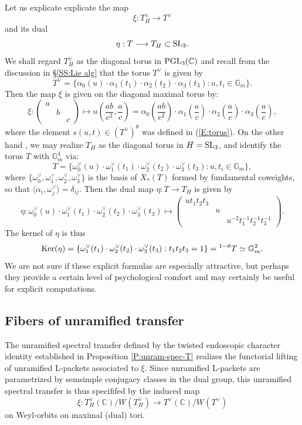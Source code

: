 \documentclass[11pt]{amsart}
\theoremstyle{plain}
\numberwithin{equation}{section}
\newcommand{\C}{\mathbb C}
\def\SL{{\rm SL}}
\def\PGL{{\rm PGL}}
\def\C{{\bf C}}
\def\C{{\mathbb C}}
\begin{document}
Let us explicate  explicate the map 
\[  \xi: T_H^{\vee}  \longrightarrow T^{\vee} \]
and its dual
\[ \eta:  T \longrightarrow T_H \subset \SL_3. \]
We shall regard $T_H^{\vee}$ as the diagonal torus in $\PGL_3(\C)$ and recall from
 the discussion in \S \ref{SS:Lie alg} that  the torus $T^{\vee}$ is given by
\[ T^{\vee} = \{ \alpha_0(u) \cdot \alpha_1(t_1) \cdot  \alpha_2(t_2) \cdot \alpha_3 (t_3): u, t_i \in \mathbb{G}_m \}.\]
  Then the map $\xi$ is given on the diagonal maximal torus by:
\[  \xi:   \left( \begin{array}{ccc}
a & & \\
& b &  \\
& & c \end{array} \right) \mapsto  u\left(\frac{ab}{c^2}, \frac{a}{c}\right) = \alpha_0\left(\frac{ab}{c^2}\right) \cdot    \alpha_1\left(\frac{a}{c}\right) \cdot  \alpha_2\left(\frac{a}{c}\right) \cdot \alpha_3 \left( \frac{a}{c}\right), \]
where the element $s(u,t) \in (T^{\vee})^{\theta}$ was defined in (\ref{E:torus}). On the other hand , we may realize $T_H$ as the diagonal torus in $H= \SL_3$, and identify the torus $T$ with $\mathbb{G}_m^4$ via:
\[  T = \{ \omega_0^{\vee}(u) \cdot\omega_1^{\vee}(t_1)  \cdot\omega_2^{\vee}(t_2)  \cdot\omega_3^{\vee}(t_3): u, t_i \in \mathbb{G}_m \}, \]  
where $\{\omega_0^{\vee} ,\omega_1^{\vee}, \omega_2^{\vee}, \omega_3^{\vee} \}$  is the basis of $X_*(T)$ formed by fundamental coweights, so that $\langle \alpha_i, \omega_j^{\vee} \rangle = \delta_{ij}$. 
Then  the dual map $\eta: T \longrightarrow T_H$ is  given by
\[  \eta: \omega_0^{\vee}(u) \cdot\omega_1^{\vee}(t_1)  \cdot\omega_2^{\vee}(t_2)  \cdot\omega_3^{\vee}(t_3)
\mapsto  \left( \begin{array}{ccc}
u t_1t_2t_3 & & \\
& u &  \\
& & u^{-2}t_1^{-1} t_2^{-1} t_3^{-1}  \end{array} \right). \] 
The kernel of $\eta$ is thus
\[  {\rm Ker}(\eta) = \{  \omega_1^{\vee}(t_1)  \cdot\omega_2^{\vee}(t_2)  \cdot\omega_3^{\vee}(t_3): t_1t_2t_3 =1 \}  = {}^{1-\theta}T \simeq  \mathbb{G}_m^2. \]
We are not sure if these explicit formulas are especially attractive, but perhaps they provide a certain level of psychological comfort and may certainly be useful for explicit computations.

\vskip 5pt
\subsection{\bf Fibers of unramified transfer}
The unramified spectral transfer defined by the twisted endoscopic character identity established in Proposition \ref{P:unram-spec-T}  realizes the functorial lifting  of unramified L-packets associated to $\xi$. Since unramified L-packets are parametrized by semsimple conjugacy classes in the dual group, this unramified spectral transfer is thus specififed by the induced map
\[  \xi :  T_H^{\vee}(\C) / W(T_H^{\vee}) \longrightarrow   T^{\vee}(\C) / W(T^{\vee}) \]
on Weyl-orbits on maximal (dual) tori.   
\vskip 5pt
\end{document}
